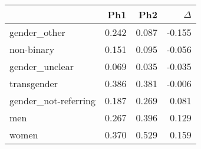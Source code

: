 \begin{tabular}{lrrr}
\toprule
 & Ph1 & Ph2 & $\Delta$ \\
\midrule
gender_other & 0.242 & 0.087 & -0.155 \\
non-binary & 0.151 & 0.095 & -0.056 \\
gender_unclear & 0.069 & 0.035 & -0.035 \\
transgender & 0.386 & 0.381 & -0.006 \\
gender_not-referring & 0.187 & 0.269 & 0.081 \\
men & 0.267 & 0.396 & 0.129 \\
women & 0.370 & 0.529 & 0.159 \\
\bottomrule
\end{tabular}
